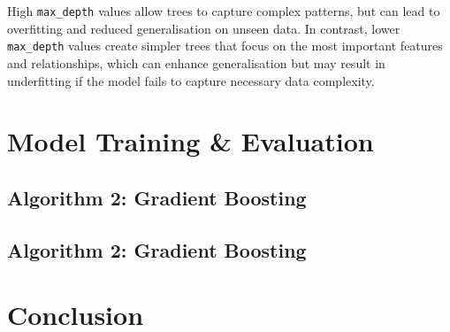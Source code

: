\documentclass[a4paper, 10pt]{article}
\begin{document}
High \texttt{max_depth} values allow trees to capture complex patterns, but can lead to overfitting and reduced generalisation on unseen data. 
In contrast, lower \texttt{max_depth} values create simpler trees that focus on the most important features and relationships, which can enhance generalisation but may result in underfitting if the model fails to capture necessary data complexity.


\section{Model Training \& Evaluation}
\subsection{Algorithm 2: Gradient Boosting}
\subsection{Algorithm 2: Gradient Boosting}

\section{Conclusion}




\nocite{*}
\printbibliography
\end{document}

